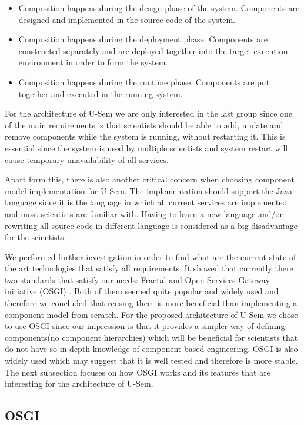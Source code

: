 \begin{itemize}
	\item  Composition happens during the design phase of the system. Components are designed and implemented in the source code of the system.
	\item  Composition happens during the deployment phase. Components are constructed separately and are deployed together into the target execution environment in order to form the system.
	\item Composition happens during the runtime phase. Components are put together and executed in the running system.
\end{itemize}

For the architecture of U-Sem we are only interested in the last group since one of the main requirements is that scientists should be able to add, update and remove components while the system is running, without restarting it. This is essential since the system is used by multiple scientists and system restart will cause temporary unavailability of all services. 

Apart form this, there is also another critical concern when choosing component model implementation for U-Sem. The implementation should support the Java language since it is the language in which all current services are implemented and most scientists are familiar with. Having to learn a new language and/or rewriting all source code in different language is considered as a big disadvantage for the scientists.

We performed further investigation in order to find what are the current state of the art technologies that satisfy all requirements. It showed that currently there two standards that satisfy our needs: Fractal \cite{Bruneton} and Open Services Gateway initiative (OSGI) \cite{OSGI}. Both of them seemed quite popular and widely used and therefore we concluded that reusing them is more beneficial than implementing a component model from scratch. For the proposed architecture of U-Sem we chose to use OSGI since our impression is that it provides a simpler way of defining components(no component hierarchies) which will be beneficial for scientists that do not have so in depth knowledge of component-based engineering. OSGI is also widely used \cite{Andre} which may suggest that it is well tested and therefore is more stable. The next subsection focuses on how OSGI works and its features that are interesting for the architecture of U-Sem.


\subsection{OSGI}

